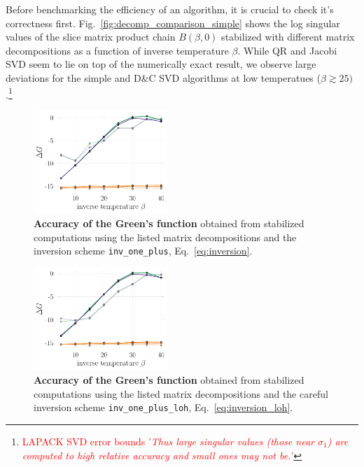 \documentclass[%
 reprint,
superscriptaddress,
citeautoscript,
showpacs,
 amsmath,amssymb,
 aps,
 prb,
longbibliography,
]{revtex4-2}
\begin{document}
Before benchmarking the efficiency of an algorithm, it is crucial to check it's correctness first. Fig.~\ref{fig:decomp_comparison_simple} shows the log singular values of the slice matrix product chain $B(\beta, 0)$ stabilized with different matrix decompositions as a function of inverse temperature $\beta$. While QR and Jacobi SVD seem to lie on top of the numerically exact result, we observe large deviations for the simple and D\&C SVD algorithms at low temperatues ($\beta \gtrsim 25)$.\footnote{\textcolor{red}{LAPACK SVD error bounds \cite{errorbounds} '\textit{Thus large singular values (those near $\sigma_1$) are computed to high relative accuracy and small ones may not be.}'}}\\

\begin{figure}[t]
	\includegraphics[width=0.45\textwidth]{figures/accuracy_greens_svd_regularinv.pdf}
	\caption{\textbf{Accuracy of the Green's function} obtained from stabilized computations using the listed matrix decompositions and the inversion scheme \texttt{inv\_one\_plus}, Eq.~\eqref{eq:inversion}. \label{fig:greens_accuracy_regularinv}}
\end{figure}

\begin{figure}[t]
	\includegraphics[width=0.45\textwidth]{figures/accuracy_greens_svd_loh.pdf}
	\caption{\textbf{Accuracy of the Green's function} obtained from stabilized computations using the listed matrix decompositions and the careful inversion scheme \texttt{inv\_one\_plus\_loh}, Eq.~\ref{eq:inversion_loh}. \label{fig:greens_accuracy_loh}}
\end{figure}
\end{document}
